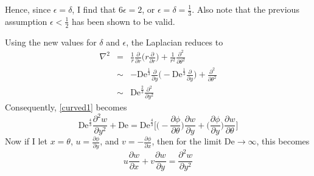 \documentclass[10pt,a4paper]{report}
\begin{document}
Hence, since $\epsilon = \delta$, I find that $6\epsilon = 2$, or $\epsilon = \delta = \frac{1}{3}$. Also note that the previous assumption $\epsilon < \frac{1}{2}$ has been shown to be valid.

Using the new values for $\delta$ and $\epsilon$, the Laplacian reduces to
\begin{eqnarray*}
\nabla^2 & = & \frac{1}{r} \frac{\partial}{\partial r} \bigg(r \frac{\partial}{\partial r} \bigg) + \frac{1}{r^2} \frac{\partial^2}{\partial \theta^2} \\
 & \sim & - \textrm{De}^{\frac{1}{3}} \frac{\partial}{\partial y} \bigg(- \textrm{De}^{\frac{1}{3}} \frac{\partial}{\partial y} \bigg) + \frac{\partial^2}{\partial \theta^2} \\
 & \sim & \textrm{De}^{\frac{2}{3}} \frac{\partial^2}{\partial y^2}
\end{eqnarray*}
Consequently, \eqref{curved1} becomes
\begin{equation*}
\textrm{De}^{\frac{4}{3}} \frac{\partial^2 w}{\partial y^2} + \textrm{De} = \textrm{De}^{\frac{4}{3}} \bigg[\bigg(-\frac{\partial \phi}{\partial \theta} \bigg) \frac{\partial w}{\partial y} + \bigg(\frac{\partial \phi}{\partial y} \bigg) \frac{\partial w}{\partial \theta} \bigg]
\end{equation*}
Now if I let $x = \theta$, $u = \frac{\partial \phi}{\partial y}$, and $v = -\frac{\partial \phi}{\partial x}$, then for the limit $\textrm{De} \rightarrow \infty$, this becomes
\begin{equation}
u \frac{\partial w}{\partial x} + v \frac{\partial w}{\partial y} = \frac{\partial ^2 w}{\partial y^2}
\end{equation}
\end{document}
